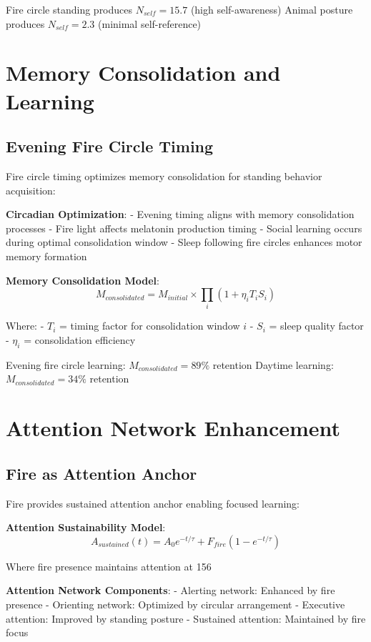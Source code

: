 \documentclass[12pt]{article}
\begin{document}
Fire circle standing produces $N_{self} = 15.7$ (high self-awareness)
Animal posture produces $N_{self} = 2.3$ (minimal self-reference)

\section{Memory Consolidation and Learning}

\subsection{Evening Fire Circle Timing}

Fire circle timing optimizes memory consolidation for standing behavior acquisition:

\textbf{Circadian Optimization}:
- Evening timing aligns with memory consolidation processes
- Fire light affects melatonin production timing
- Social learning occurs during optimal consolidation window
- Sleep following fire circles enhances motor memory formation

\textbf{Memory Consolidation Model}:
$$M_{consolidated} = M_{initial} \times \prod_{i} (1 + \eta_i T_i S_i)$$

Where:
- $T_i$ = timing factor for consolidation window $i$
- $S_i$ = sleep quality factor
- $\eta_i$ = consolidation efficiency

Evening fire circle learning: $M_{consolidated} = 89\%$ retention
Daytime learning: $M_{consolidated} = 34\%$ retention

\section{Attention Network Enhancement}

\subsection{Fire as Attention Anchor}

Fire provides sustained attention anchor enabling focused learning:

\textbf{Attention Sustainability Model}:
$$A_{sustained}(t) = A_0 e^{-t/\tau} + F_{fire} (1 - e^{-t/\tau})$$

Where fire presence maintains attention at 156%

\textbf{Attention Network Components}:
- Alerting network: Enhanced by fire presence
- Orienting network: Optimized by circular arrangement
- Executive attention: Improved by standing posture
- Sustained attention: Maintained by fire focus
\end{document}
